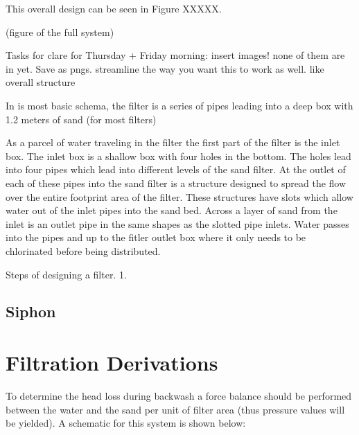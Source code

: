 \documentclass[letterpaper,10pt,english]{sphinxmanual}
\begin{document}
This overall design can be seen in Figure XXXXX.

(figure of the full system)

Tasks for clare for Thursday + Friday morning: insert images! none of them are in yet. Save as pngs. streamline the way you want this to work as well. like overall structure

In is most basic schema, the filter is a series of pipes leading into a deep box with 1.2 meters of sand (for most filters)

As a parcel of water traveling in the filter the first part of the filter is the inlet box. The inlet box is a shallow box with four holes in the bottom. The holes lead into four pipes which lead into different levels of the sand filter. At the outlet of each of these pipes into the sand filter is a structure designed to spread the flow over the entire footprint area of the filter. These structures have slots which allow water out of the inlet pipes into the sand bed. Across a layer of sand from the inlet is an outlet pipe in the same shapes as the slotted pipe inlets. Water passes into the pipes and up to the fitler outlet box where it only needs to be chlorinated before being distributed.

Steps of designing a filter.
1.


\section{Siphon}
\label{\detokenize{Filtration/Filtration_Design:siphon}}\label{\detokenize{Filtration/Filtration_Design:id1}}

\chapter{Filtration Derivations}
\label{\detokenize{Filtration/Filtration_Derivations:filtration-derivations}}\label{\detokenize{Filtration/Filtration_Derivations:title-filtration-derivations}}\label{\detokenize{Filtration/Filtration_Derivations::doc}}\label{\detokenize{Filtration/Filtration_Derivations:derivation-backwash-headloss-force-balance}}
To determine the head loss during backwash a force balance should be performed between the water and the sand per unit of filter area (thus pressure values will be yielded). A schematic for this system is shown below:

\begin{figure}[htbp]
\centering

\noindent{}
\label{\detokenize{Filtration/Filtration_Derivations:figure-force-balance}}\end{figure}
\end{document}

